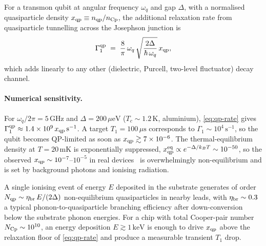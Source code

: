 \begin{statement}
\label{stmt:qp-relaxation}
For a transmon qubit at angular frequency $\omega_q$ and gap
$\Delta$, with a normalised quasiparticle density
$x_{\rm qp}\equiv n_{\rm qp}/n_{\rm Cp}$, the additional
relaxation rate from quasiparticle tunnelling across the
Josephson junction is
\begin{equation}
\label{eq:qp-rate}
\Gamma_{1}^{\rm qp} \;=\; \frac{8}{\pi}\,\omega_q\,
\sqrt{\frac{2\Delta}{\hbar\,\omega_q}}\,x_{\rm qp},
\end{equation}
which adds linearly to any other (dielectric, Purcell, two-level
fluctuator) decay channel.
\end{statement}

\paragraph{Numerical sensitivity.}
For $\omega_q/2\pi=5\,\text{GHz}$ and $\Delta=200\,\mu\text{eV}$
($T_c\sim 1.2\,\text{K}$, aluminium), \cref{eq:qp-rate} gives
$\Gamma_1^{\rm qp}\approx 1.4\times 10^9\,x_{\rm qp}\,\text{s}^{-1}$.
A target $T_1=100\,\mu\text{s}$ corresponds to $\Gamma_1\sim
10^4\,\text{s}^{-1}$, so the qubit becomes QP-limited as soon as
$x_{\rm qp}\gtrsim 7\times 10^{-6}$. The thermal-equilibrium
density at $T=20\,\text{mK}$ is exponentially suppressed,
$x_{\rm qp}^{\rm eq}\propto e^{-\Delta/k_B T}\sim 10^{-50}$, so
the observed $x_{\rm qp}\sim 10^{-7}$--$10^{-5}$ in real
devices~\cite{catelani2011,sun2012} is overwhelmingly
non-equilibrium and is set by background photons and ionising
radiation.

\begin{statement}
\label{stmt:qp-burst}
A single ionising event of energy $E$ deposited in the substrate
generates of order $N_{\rm qp}\sim \eta_{\rm br}\, E /(2\Delta)$
non-equilibrium quasiparticles in nearby leads, with
$\eta_{\rm br}\sim 0.3$ a typical phonon-to-quasiparticle
branching efficiency after down-conversion below the substrate
phonon energies. For a chip with total Cooper-pair number
$N_{\rm Cp}\sim 10^{10}$, an energy deposition $E\gtrsim 1\,\text{keV}$
is enough to drive $x_{\rm qp}$ above the relaxation floor of
\cref{eq:qp-rate} and produce a measurable transient $T_1$ drop.
\end{statement}

